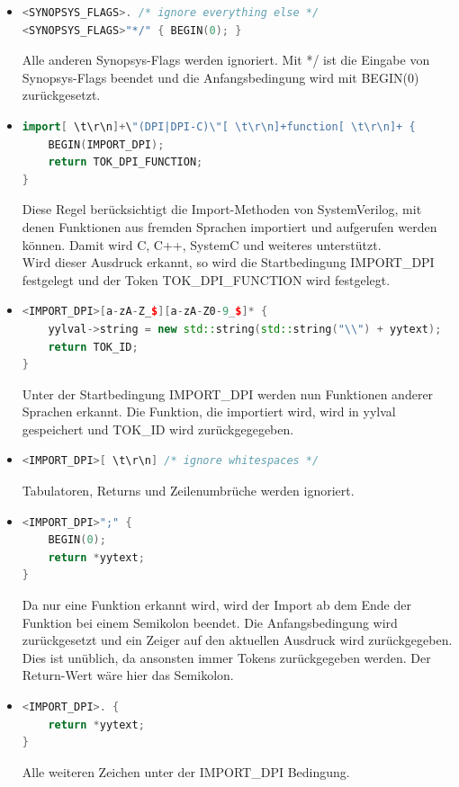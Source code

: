 \documentclass[11pt]{report}
\begin{document}
\begin{itemize}
\item
\begin{lstlisting}[language=C++]
<SYNOPSYS_FLAGS>. /* ignore everything else */
<SYNOPSYS_FLAGS>"*/" { BEGIN(0); }
\end{lstlisting}
Alle anderen Synopsys-Flags werden ignoriert. Mit */ ist die Eingabe von Synopsys-Flags beendet und die Anfangsbedingung wird mit BEGIN(0) zurückgesetzt.
\item
\begin{lstlisting}[language=C++]
import[ \t\r\n]+\"(DPI|DPI-C)\"[ \t\r\n]+function[ \t\r\n]+ {
	BEGIN(IMPORT_DPI);
	return TOK_DPI_FUNCTION;
}
\end{lstlisting}
Diese Regel berücksichtigt die Import-Methoden von SystemVerilog, mit denen Funktionen aus fremden Sprachen importiert und aufgerufen werden können. Damit wird C, C++, SystemC und weiteres unterstützt.\\
Wird dieser Ausdruck erkannt, so wird die Startbedingung IMPORT\_DPI festgelegt und der Token TOK\_DPI\_FUNCTION wird festgelegt.
\item
\begin{lstlisting}[language=C++]
<IMPORT_DPI>[a-zA-Z_$][a-zA-Z0-9_$]* {
	yylval->string = new std::string(std::string("\\") + yytext);
	return TOK_ID;
}
\end{lstlisting}
Unter der Startbedingung IMPORT\_DPI werden nun Funktionen anderer Sprachen erkannt. Die Funktion, die importiert wird, wird in yylval gespeichert und TOK\_ID wird zurückgegegeben.

\item
\begin{lstlisting}[language=C++]
<IMPORT_DPI>[ \t\r\n] /* ignore whitespaces */
\end{lstlisting}
Tabulatoren, Returns und Zeilenumbrüche werden ignoriert.
\item
\begin{lstlisting}[language=C++]
<IMPORT_DPI>";" {
	BEGIN(0);
	return *yytext;
}
\end{lstlisting}
Da nur eine Funktion erkannt wird, wird der Import ab dem Ende der Funktion bei einem Semikolon beendet. Die Anfangsbedingung wird zurückgesetzt und ein Zeiger auf den aktuellen Ausdruck wird zurückgegeben. Dies ist unüblich, da ansonsten immer Tokens zurückgegeben werden. Der Return-Wert wäre hier das Semikolon.

\item
\begin{lstlisting}[language=C++]
<IMPORT_DPI>. {
	return *yytext;
}
\end{lstlisting}
Alle weiteren Zeichen unter der IMPORT\_DPI Bedingung.


\end{itemize}
\end{document}
